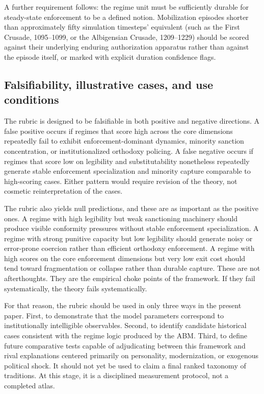 \documentclass[12pt]{article}
\begin{document}
A further requirement follows: the regime unit must be sufficiently durable for steady-state enforcement to be a defined notion. Mobilization episodes shorter than approximately fifty simulation timesteps' equivalent (such as the First Crusade, 1095--1099, or the Albigensian Crusade, 1209--1229) should be scored against their underlying enduring authorization apparatus rather than against the episode itself, or marked with explicit duration confidence flags.

\subsection{Falsifiability, illustrative cases, and use conditions}

The rubric is designed to be falsifiable in both positive and negative directions. A false positive occurs if regimes that score high across the core dimensions repeatedly fail to exhibit enforcement-dominant dynamics, minority sanction concentration, or institutionalized orthodoxy policing. A false negative occurs if regimes that score low on legibility and substitutability nonetheless repeatedly generate stable enforcement specialization and minority capture comparable to high-scoring cases. Either pattern would require revision of the theory, not cosmetic reinterpretation of the cases.

The rubric also yields null predictions, and these are as important as the positive ones. A regime with high legibility but weak sanctioning machinery should produce visible conformity pressures without stable enforcement specialization. A regime with strong punitive capacity but low legibility should generate noisy or error-prone coercion rather than efficient orthodoxy enforcement. A regime with high scores on the core enforcement dimensions but very low exit cost should tend toward fragmentation or collapse rather than durable capture. These are not afterthoughts. They are the empirical choke points of the framework. If they fail systematically, the theory fails systematically.

For that reason, the rubric should be used in only three ways in the present paper. First, to demonstrate that the model parameters correspond to institutionally intelligible observables. Second, to identify candidate historical cases consistent with the regime logic produced by the ABM. Third, to define future comparative tests capable of adjudicating between this framework and rival explanations centered primarily on personality, modernization, or exogenous political shock. It should not yet be used to claim a final ranked taxonomy of traditions. At this stage, it is a disciplined measurement protocol, not a completed atlas.
\end{document}
